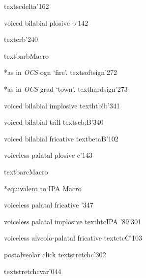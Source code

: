 %
  {}%
  {\tbs textscdelta}{}{\PSG}{'162}

%
  {voiced bilabial plosive}%
  {b}{}{\ipaall}{'142}

%
  {}%
  {\tbs textcrb}{}{\PSG}{'240}

%
  {}%
  {\tbs textbarb}{}{\PSG}{Macro}

%
  {*as in \emph{OCS} ogn\textsoftsign{} `fire'.}%
  {\tbs textsoftsign}{}{\PSG}{'272}

%
  {*as in \emph{OCS} grad\texthardsign{} `town'.}%
  {\tbs texthardsign}{}{\PSG}{'273}

%
  {voiced bilabial implosive}%
  {\tbs texthtb}{\tbs!b}{\ipaall}{'341}

%
  {voiced bilabial trill}%
  {\tbs textscb}{\tbs;B}{\ipanew}{'340}

%
  {voiced bilabial fricative}%
  {\tbs textbeta}{B}{\ipaall}{'102}

%
  {voiceless palatal plosive}%
  {c}{}{\ipaall}{'143}

%
  {}%
  {\tbs textbarc}{}{\PSG}{Macro}

%
  {*equivalent to IPA }%
  {}{}{\PSG}{Macro}

%
  {voiceless palatal fricative}%
  {}{}{\ipaall}{'347}

%
  {voiceless palatal implosive}%
  {\tbs texthtc}{}{IPA '89}{'301}

%
  {voiceless alveolo-palatal fricative}%
  {\tbs textctc}{C}{\ipaall}{'103}

%
  {postalveolar click}%
  {\tbs textstretchc}{}{\ipaold}{'302}%

%
  {}%
  {\tbs textstretchcvar}{}{\cite{Hottentot}}{'044}

